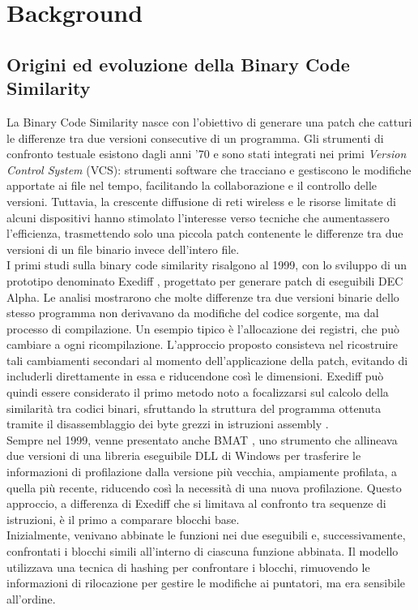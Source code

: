 \documentclass[12pt,a4paper,openright,twoside]{report}
\begin{document}
\chapter{Background}\label{Cap2}

\section{Origini ed evoluzione della Binary Code Similarity}

La Binary Code Similarity nasce con l'obiettivo di generare una patch che catturi le differenze tra due versioni consecutive di un programma. Gli strumenti di confronto testuale esistono dagli anni '70 e sono stati integrati nei primi \textit{Version Control System} (VCS): strumenti software che tracciano e gestiscono le modifiche apportate ai file nel tempo, facilitando la collaborazione e il controllo delle versioni. Tuttavia, la crescente diffusione di reti wireless e le risorse limitate di alcuni dispositivi hanno stimolato l'interesse verso tecniche che aumentassero l'efficienza, trasmettendo solo una piccola patch contenente le differenze tra due versioni di un file binario invece dell'intero file.\\
I primi studi sulla binary code similarity risalgono al 1999, con lo sviluppo di un prototipo denominato Exediff \cite{Exediff}, progettato per generare patch di eseguibili DEC Alpha. Le analisi mostrarono che molte differenze tra due versioni binarie dello stesso programma non derivavano da modifiche del codice sorgente, ma dal processo di compilazione. Un esempio tipico è l’allocazione dei registri, che può cambiare a ogni ricompilazione. L’approccio proposto consisteva nel ricostruire tali cambiamenti secondari al momento dell’applicazione della patch, evitando di includerli direttamente in essa e riducendone così le dimensioni. Exediff può quindi essere considerato il primo metodo noto a focalizzarsi sul calcolo della similarità tra codici binari, sfruttando la struttura del programma ottenuta tramite il disassemblaggio dei byte grezzi in istruzioni assembly \cite{Survey}.\\
Sempre nel 1999, venne presentato anche BMAT \cite{Bmat}, uno strumento che allineava due versioni di una libreria eseguibile DLL di Windows per trasferire le informazioni di profilazione dalla versione più vecchia, ampiamente profilata, a quella più recente, riducendo così la necessità di una nuova profilazione. Questo approccio, a differenza di Exediff che si limitava al confronto tra sequenze di istruzioni, è il primo a comparare blocchi base.\\
Inizialmente, venivano abbinate le funzioni nei due eseguibili e, successivamente, confrontati i blocchi simili all’interno di ciascuna funzione abbinata. Il modello utilizzava una tecnica di hashing per confrontare i blocchi, rimuovendo le informazioni di rilocazione per gestire le modifiche ai puntatori, ma era sensibile all’ordine.
\end{document}
